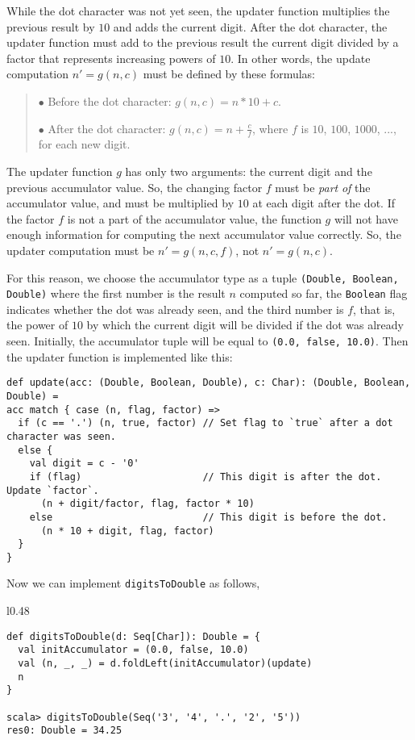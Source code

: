 While the dot character was not yet seen, the updater function multiplies
the previous result by $10$ and adds the current digit. After the
dot character, the updater function must add to the previous result
the current digit divided by a factor that represents increasing powers
of $10$. In other words, the update computation $n'=g(n,c)$ must
be defined by these formulas:
\begin{quotation}
$\bullet$ Before the dot character: $g(n,c)=n*10+c$.

$\bullet$ After the dot character: $g(n,c)=n+\frac{c}{f}$, where
$f$ is $10$, $100$, $1000$, ..., for each new digit.
\end{quotation}
The updater function $g$ has only two arguments: the current digit
and the previous accumulator value. So, the changing factor $f$ must
be \emph{part} \emph{of} the accumulator value, and must be multiplied
by $10$ at each digit after the dot. If the factor $f$ is not a
part of the accumulator value, the function $g$ will not have enough
information for computing the next accumulator value correctly. So,
the updater computation must be $n'=g(n,c,f)$, not $n'=g(n,c)$.

For this reason, we choose the accumulator type as a tuple \lstinline!(Double, Boolean, Double)!
where the first number is the result $n$ computed so far, the \lstinline!Boolean!
flag indicates whether the dot was already seen, and the third number
is $f$, that is, the power of $10$ by which the current digit will
be divided if the dot was already seen. Initially, the accumulator
tuple will be equal to \lstinline!(0.0, false, 10.0)!. Then the updater
function is implemented like this:
\begin{lstlisting}
def update(acc: (Double, Boolean, Double), c: Char): (Double, Boolean, Double) =
acc match { case (n, flag, factor) =>
  if (c == '.') (n, true, factor) // Set flag to `true` after a dot character was seen.
  else {
    val digit = c - '0'
    if (flag)                     // This digit is after the dot. Update `factor`.
      (n + digit/factor, flag, factor * 10)
    else                          // This digit is before the dot.
      (n * 10 + digit, flag, factor)
  }
}
\end{lstlisting}
Now we can implement \lstinline!digitsToDouble! as follows,

\begin{wrapfigure}{l}{0.48\columnwidth}%
\vspace{-0.75\baselineskip}
\begin{lstlisting}
def digitsToDouble(d: Seq[Char]): Double = {
  val initAccumulator = (0.0, false, 10.0)
  val (n, _, _) = d.foldLeft(initAccumulator)(update)
  n
}

scala> digitsToDouble(Seq('3', '4', '.', '2', '5'))
res0: Double = 34.25
\end{lstlisting}

\vspace{-1.5\baselineskip}
\end{wrapfigure}%

